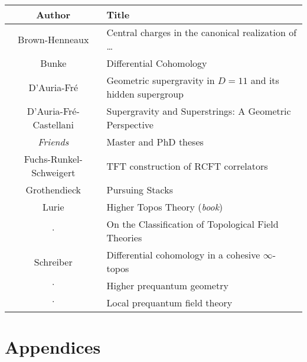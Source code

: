 \documentclass[11pt, a4paper]{report}
\begin{document}
    \begin{center}
        \begin{tabular}{|c|l|}
            \hline
            Author&Title\\
            \hline
            Brown-Henneaux&Central charges in the canonical realization of \ldots\\
			Bunke&Differential Cohomology\\
			D'Auria-Fr\'e&Geometric supergravity in $D=11$ and its hidden supergroup\\
			D'Auria-Fr\'e-Castellani&Supergravity and Superstrings: A Geometric Perspective\\
            \textit{Friends}&Master and PhD theses\\
            Fuchs-Runkel-Schweigert&TFT construction of RCFT correlators\\
            Grothendieck&Pursuing Stacks\\
            Lurie&Higher Topos Theory (\textit{book})\\
            $\cdot$&On the Classification of Topological Field Theories\\
            Schreiber&Differential cohomology in a cohesive $\infty$-topos\\
            $\cdot$&Higher prequantum geometry\\
            $\cdot$&Local prequantum field theory\\
            \hline
        \end{tabular}
    \end{center}

\part{Appendices}
\begin{appendices}





\end{appendices}

\nomenclature[S_zsyminto]{$]a,b[$}{open interval}

\printnomenclature

\nocite{*}



\printindex
\end{document}

